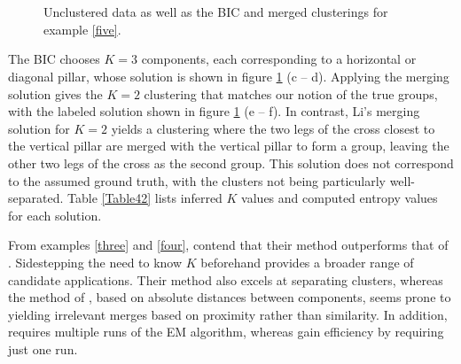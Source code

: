 \documentclass{uwstat572}
\renewcommand\;{\,}
\begin{document}
 \begin{figure}
\begin{center}
\\
\\
\end{center}
\caption{Unclustered data as well as the BIC and merged clusterings for example \ref{five}.}
\label{Example4_2}
\end{figure}

The BIC chooses $K = 3$ components, each corresponding to a horizontal or diagonal pillar, whose solution is shown in figure \ref{Example4_2} (c -- d).
Applying the merging solution gives the $K = 2$ clustering that matches our notion of the true groups, with the labeled solution shown in figure \ref{Example4_2} (e -- f).
In contrast, Li's merging solution for $K = 2$ yields a clustering where the two legs of the cross closest to the vertical pillar are merged with the vertical pillar to form a group, leaving the other two legs of the cross as the second group.
This solution does not correspond to the assumed ground truth, with the clusters not being particularly well-separated.
Table \ref{Table42} lists inferred $K$ values and computed entropy values for each solution.

From examples \ref{three} and \ref{four}, \cite{Baudry10} contend that their method outperforms that of \cite{Li05}.
Sidestepping the need to know $K$ beforehand provides a broader range of candidate applications.
Their method also excels at separating clusters, whereas the method of \cite{Li05}, based on absolute distances between components, seems prone to yielding irrelevant merges based on proximity rather than similarity. 
In addition, \cite{Li05} requires multiple runs of the EM algorithm, whereas \cite{Baudry10} gain efficiency by requiring just one run.
\end{document}
